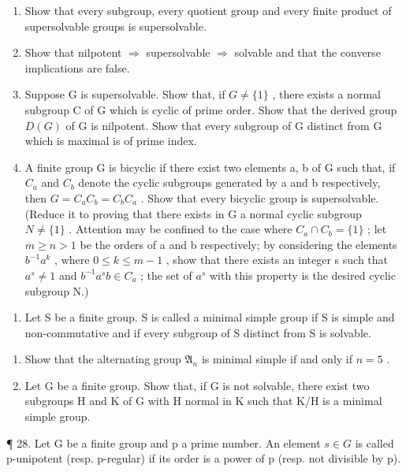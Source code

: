 \begin{enumerate}
\def\labelenumi{(\alph{enumi})}
\item
  Show that every subgroup, every quotient group and every finite product of supersolvable groups is supersolvable.
\item
  Show that nilpotent \(\Rightarrow\) supersolvable \(\Rightarrow\) solvable and that the converse implications are false.
\item
  Suppose G is supersolvable. Show that, if \(G \neq \{1\}\) , there exists a normal subgroup C of G which is cyclic of prime order. Show that the derived group \(D(G)\) of G is nilpotent. Show that every subgroup of G distinct from G which is maximal is of prime index.
\item
  A finite group G is bicyclic if there exist two elements a, b of G such that, if \(C_{a}\) and \(C_{b}\) denote the cyclic subgroups generated by a and b respectively, then \(G = C_{a}C_{b} = C_{b}C_{a}\) . Show that every bicyclic group is supersolvable. (Reduce it to proving that there exists in G a normal cyclic subgroup \(N \neq \{1\}\) . Attention may be confined to the case where \(C_{a} \cap C_{b} = \{1\}\) ; let \(m \geqslant n > 1\) be the orders of a and b respectively; by considering the elements \(b^{-1}a^{k}\) , where \(0 \leqslant k \leqslant m - 1\) , show that there exists an integer s such that \(a^{s} \neq 1\) and \(b^{-1}a^{s}b \in C_{a}\) ; the set of \(a^{s}\) with this property is the desired cyclic subgroup N.)
\end{enumerate}

\begin{enumerate}
\def\labelenumi{\arabic{enumi}.}
\setcounter{enumi}{26}
\tightlist
\item
  Let S be a finite group. S is called a minimal simple group if S is simple and non-commutative and if every subgroup of S distinct from S is solvable.
\end{enumerate}

\begin{enumerate}
\def\labelenumi{(\alph{enumi})}
\item
  Show that the alternating group \(\mathfrak{A}_n\) is minimal simple if and only if \(n = 5\) .
\item
  Let G be a finite group. Show that, if G is not solvable, there exist two subgroups H and K of G with H normal in K such that K/H is a minimal simple group.
\end{enumerate}

¶ 28. Let G be a finite group and p a prime number. An element \(s \in G\) is called p-unipotent (resp. p-regular) if its order is a power of p (resp. not divisible by p).

